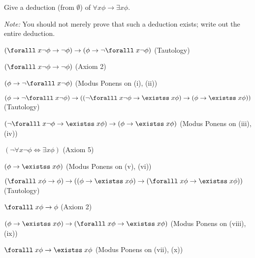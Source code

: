 \begin{problem}[4]
  Give a deduction (from $\emptyset$) of $\forall x \phi \to \exists x \phi$.

  \step
  \emph{Note: } You should not merely prove that such a deduction exists;
    write out the entire deduction.
\end{problem}
\begin{Answer}
  \begin{enumroman}
    \item $(\forall x \lnot \phi \lto \lnot \phi) \lto (\phi \lto \lnot \forall x \lnot \phi)$ (Tautology)
    \item $(\forall x \lnot \phi \lto \lnot \phi)$ (Axiom 2)
    \item $(\phi \lto \lnot \forall x \lnot \phi)$ (Modus Ponens on (i), (ii))
    \item $(\phi \lto \lnot \forall x \lnot \phi) \lto ((\lnot \forall x \lnot \phi \lto \exists x \phi) \lto (\phi \lto \exists x \phi))$ (Tautology)
    \item $(\lnot \forall x \lnot \phi \lto \exists x \phi) \lto (\phi \lto \exists x \phi)$ (Modus Ponens on (iii), (iv))
    \item $(\lnot \forall x \lnot \phi \iff \exists x \phi)$ (Axiom 5)
    \item $(\phi \lto \exists x \phi)$ (Modus Ponens on (v), (vi))
    \item $(\forall x \phi \to \phi) \lto ((\phi \lto \exists x \phi) \lto (\forall x \phi \lto \exists x \phi))$ (Tautology)
    \item $\forall x \phi \lto \phi$ (Axiom 2)
    \item $(\phi \lto \exists x \phi) \lto (\forall x \phi \lto \exists x \phi)$ (Modus Ponens on (viii), (ix))
    \item $\forall x \phi \lto \exists x \phi$ (Modus Ponens on (vii), (x))
  \end{enumroman}
\end{Answer}
